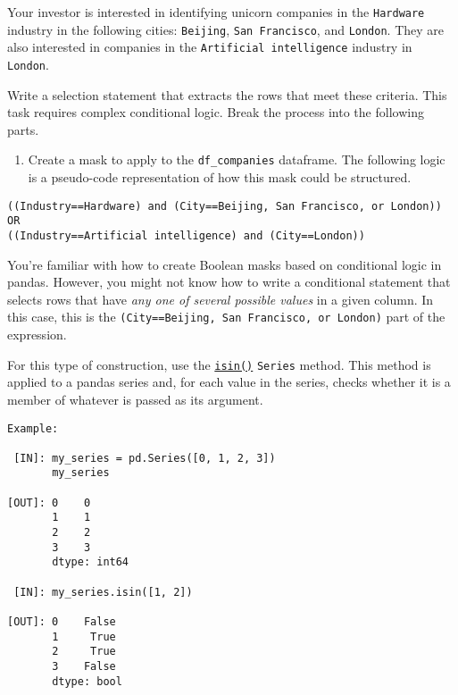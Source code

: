 \documentclass[11pt]{article}
\providecommand{\tightlist}{%
      \setlength{\itemsep}{0pt}\setlength{\parskip}{0pt}}
\begin{document}
Your investor is interested in identifying unicorn companies in the
\texttt{Hardware} industry in the following cities: \texttt{Beijing},
\texttt{San\ Francisco}, and \texttt{London}. They are also interested
in companies in the \texttt{Artificial\ intelligence} industry in
\texttt{London}.

Write a selection statement that extracts the rows that meet these
criteria. This task requires complex conditional logic. Break the
process into the following parts.

\begin{enumerate}
\def\labelenumi{\arabic{enumi}.}
\tightlist
\item
  Create a mask to apply to the \texttt{df\_companies} dataframe. The
  following logic is a pseudo-code representation of how this mask could
  be structured.
\end{enumerate}

\begin{verbatim}
((Industry==Hardware) and (City==Beijing, San Francisco, or London)) 
OR  
((Industry==Artificial intelligence) and (City==London))
\end{verbatim}

You're familiar with how to create Boolean masks based on conditional
logic in pandas. However, you might not know how to write a conditional
statement that selects rows that have \emph{any one of several possible
values} in a given column. In this case, this is the
\texttt{(City==Beijing,\ San\ Francisco,\ or\ London)} part of the
expression.

For this type of construction, use the
\href{https://pandas.pydata.org/docs/reference/api/pandas.Series.isin.html\#pandas.Series.isin}{\texttt{isin()}}
\texttt{Series} method. This method is applied to a pandas series and,
for each value in the series, checks whether it is a member of whatever
is passed as its argument.

\begin{verbatim}
Example:

 [IN]: my_series = pd.Series([0, 1, 2, 3])
       my_series
       
[OUT]: 0    0
       1    1
       2    2
       3    3
       dtype: int64
       
 [IN]: my_series.isin([1, 2])
       
[OUT]: 0    False
       1     True
       2     True
       3    False
       dtype: bool
       
\end{verbatim}
\end{document}

